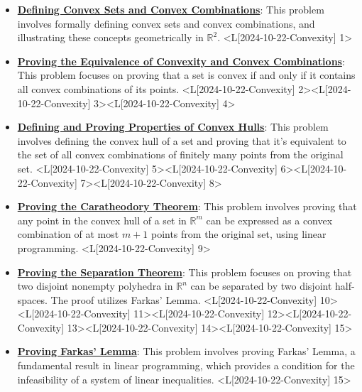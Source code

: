 \documentclass{article}%
\begin{document}
\begin{itemize}[[leftmargin=*]]%
\item \href{https://www.math.purdue.edu/~yipn/421/2024-10-22-Convexity.pdf#page=1}{\textbf{Defining Convex Sets and Convex Combinations}}: This problem involves formally defining convex sets and convex combinations, and illustrating these concepts geometrically in $\mathbb{R}^2$. <L[2024-10-22-Convexity] 1>%
\item \href{https://www.math.purdue.edu/~yipn/421/2024-10-22-Convexity.pdf#page=2}{\textbf{Proving the Equivalence of Convexity and Convex Combinations}}: This problem focuses on proving that a set is convex if and only if it contains all convex combinations of its points. <L[2024-10-22-Convexity] 2><L[2024-10-22-Convexity] 3><L[2024-10-22-Convexity] 4>%
\item \href{https://www.math.purdue.edu/~yipn/421/2024-10-22-Convexity.pdf#page=5}{\textbf{Defining and Proving Properties of Convex Hulls}}: This problem involves defining the convex hull of a set and proving that it's equivalent to the set of all convex combinations of finitely many points from the original set. <L[2024-10-22-Convexity] 5><L[2024-10-22-Convexity] 6><L[2024-10-22-Convexity] 7><L[2024-10-22-Convexity] 8>%
\item \href{https://www.math.purdue.edu/~yipn/421/2024-10-22-Convexity.pdf#page=9}{\textbf{Proving the Caratheodory Theorem}}: This problem involves proving that any point in the convex hull of a set in $\mathbb{R}^m$ can be expressed as a convex combination of at most $m+1$ points from the original set, using linear programming. <L[2024-10-22-Convexity] 9>%
\item \href{https://www.math.purdue.edu/~yipn/421/2024-10-22-Convexity.pdf#page=10}{\textbf{Proving the Separation Theorem}}: This problem focuses on proving that two disjoint nonempty polyhedra in $\mathbb{R}^n$ can be separated by two disjoint half-spaces. The proof utilizes Farkas' Lemma. <L[2024-10-22-Convexity] 10><L[2024-10-22-Convexity] 11><L[2024-10-22-Convexity] 12><L[2024-10-22-Convexity] 13><L[2024-10-22-Convexity] 14><L[2024-10-22-Convexity] 15>%
\item \href{https://www.math.purdue.edu/~yipn/421/2024-10-22-Convexity.pdf#page=15}{\textbf{Proving Farkas' Lemma}}: This problem involves proving Farkas' Lemma, a fundamental result in linear programming, which provides a condition for the infeasibility of a system of linear inequalities. <L[2024-10-22-Convexity] 15>%
\end{itemize}%
\end{document}
